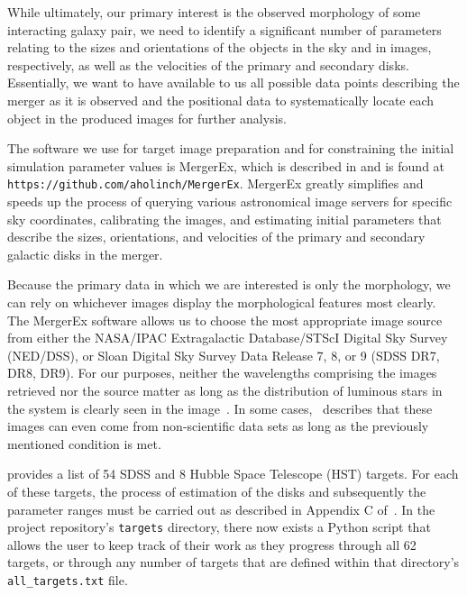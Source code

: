 While ultimately, our primary interest is the observed morphology of some
interacting galaxy pair, we need to identify a significant number of parameters
relating to the sizes and orientations of the objects in the sky and in images,
respectively, as well as the velocities of the primary and secondary disks.
Essentially, we want to have available to us all possible data points describing
the merger as it is observed and the positional data to systematically
locate each object in the produced images for further analysis.

The software we use for target image preparation and for constraining the
initial simulation parameter values is MergerEx, which is described in
\citet{holincheckThesis} and is found at
\texttt{https://github.com/aholinch/MergerEx}. MergerEx greatly simplifies and
speeds up the process of querying various astronomical image servers for
specific sky coordinates, calibrating the images, and estimating initial
parameters that describe the sizes, orientations, and velocities of the
primary and secondary galactic disks in the merger.

Because the primary data in which we are interested is only the morphology,
we can rely on whichever images display the morphological features most clearly.
The MergerEx software allows us to choose the most appropriate image source from
either the NASA/IPAC Extragalactic Database/STScI Digital Sky Survey (NED/DSS),
or Sloan Digital Sky Survey Data Release 7, 8, or 9 (SDSS DR7, DR8, DR9).
For our purposes, neither the wavelengths comprising the images retrieved nor
the source matter as long as the distribution of luminous stars in the system is
clearly seen in the image~\cite{Holincheck2015}.
In some cases,~\citet{Holincheck2015}
describes that these images can even come from non-scientific data sets as long
as the previously mentioned condition is met.

\citet{Holincheck2015} provides a list of 54 SDSS and 8 Hubble Space Telescope
(HST) targets. For each of these targets, the process of estimation
of the disks and subsequently the parameter ranges must be carried out
as described in Appendix C of~\citet{holincheckThesis}.
In the project repository's \texttt{targets} directory,
there now exists a Python script that allows the user to keep track
of their work as they progress through all 62 targets, or through any number of
targets that are defined within that directory's \texttt{all\_targets.txt} file.
